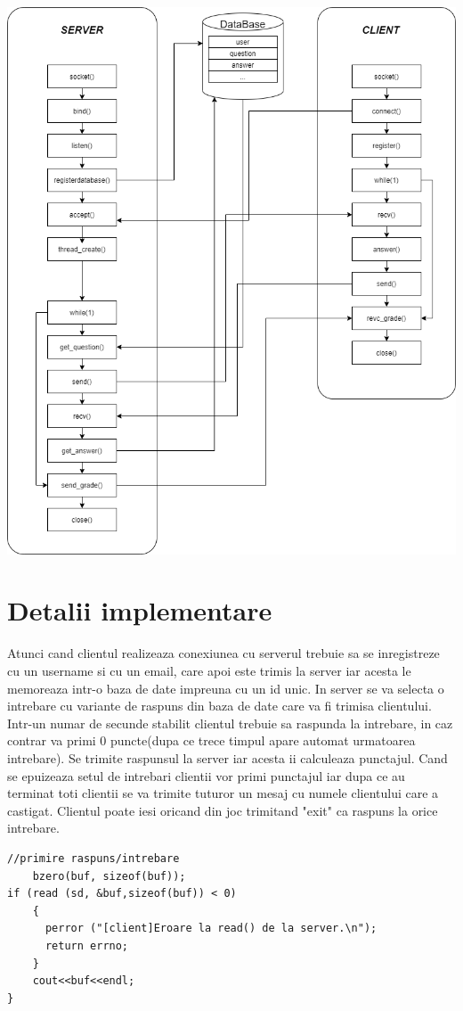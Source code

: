 \documentclass[12]{article}
\begin{document}
\includegraphics[scale=0.41]{serverclient.png}

\section{Detalii implementare}
\hspace{5mm}Atunci cand clientul realizeaza conexiunea cu serverul trebuie sa se inregistreze cu un username si cu un email, care apoi este trimis la server iar acesta le memoreaza intr-o baza de date impreuna cu un id unic. 
\State \hspace{5mm}In server se va selecta o intrebare cu variante de raspuns din baza de date care va fi trimisa clientului. Intr-un numar de secunde stabilit clientul trebuie sa raspunda la intrebare, in caz contrar va primi 0 puncte(dupa ce trece timpul apare automat urmatoarea intrebare). Se trimite raspunsul la server iar acesta ii calculeaza punctajul.
\State
\State \hspace{5mm} Cand se epuizeaza setul de intrebari clientii vor primi punctajul iar dupa ce au terminat toti clientii se va trimite tuturor un mesaj cu numele clientului care a castigat.
\State \hspace{5mm} Clientul poate iesi oricand din joc trimitand "exit" ca raspuns la orice intrebare. 
\State
\State
\State
\begin{lstlisting}[]
//primire raspuns/intrebare
    bzero(buf, sizeof(buf));
if (read (sd, &buf,sizeof(buf)) < 0) 
    {
      perror ("[client]Eroare la read() de la server.\n");
      return errno;
    }
    cout<<buf<<endl;
}
\end{lstlisting}
\end{document}
